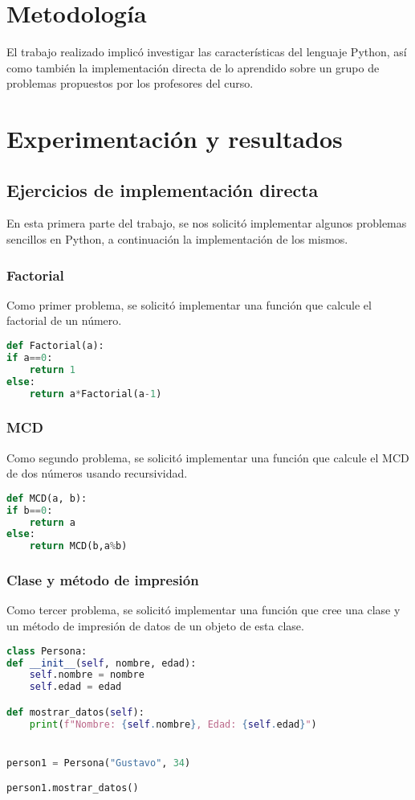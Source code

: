 \documentclass[conference]{IEEEtran}
\begin{document}
\section{Metodología}
El trabajo realizado implicó investigar las características del lenguaje Python,
así como también la implementación directa de lo aprendido sobre un grupo de problemas
propuestos por los profesores del curso.
\section{Experimentación y resultados}

\subsection{Ejercicios de implementación directa}
En esta primera parte del trabajo, se nos solicitó implementar
algunos problemas sencillos en Python, a continuación la implementación
de los mismos.

\subsubsection{Factorial}
Como primer problema, se solicitó implementar una función
que calcule el factorial de un número.
\begin{lstlisting}[language=Python, caption=Factorial]
def Factorial(a):
if a==0:
	return 1
else:
	return a*Factorial(a-1)
\end{lstlisting}


\subsubsection{MCD}
Como segundo problema, se solicitó implementar una función
que calcule el MCD de dos números usando recursividad.
\begin{lstlisting}[language=Python, caption=MCD]
def MCD(a, b):
if b==0:
	return a
else:
	return MCD(b,a%b)
\end{lstlisting}

\subsubsection{Clase y método de impresión}
Como tercer problema, se solicitó implementar una función
que cree una clase y un método de impresión de datos de un
objeto de esta clase.
\begin{lstlisting}[language=Python, caption=Clase e impresión]
class Persona:
def __init__(self, nombre, edad):
	self.nombre = nombre
	self.edad = edad

def mostrar_datos(self):
	print(f"Nombre: {self.nombre}, Edad: {self.edad}")


person1 = Persona("Gustavo", 34)

person1.mostrar_datos()
\end{lstlisting}
\end{document}
